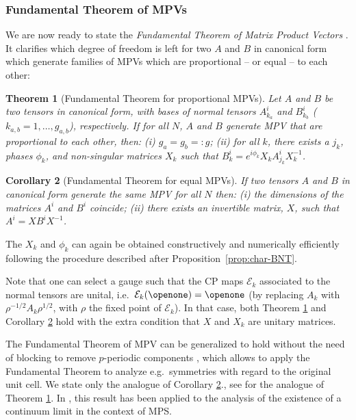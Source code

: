 \documentclass[rmp,aps,reprint,superscriptaddress,nobalancelastpage]{revtex4-1}
\newtheorem{thm}{Theorem}[section]
\newtheorem{cor}[thm]{Corollary}
\begin{document}
\subsubsection{Fundamental Theorem of MPVs}


We are now ready to state the \emph{Fundamental Theorem of Matrix Product Vectors} \cite{cirac:mpdo-rgfp}. It clarifies which degree of freedom is left for two $A$ and $B$ in canonical form which generate families of MPVs which are proportional -- or equal -- to each other:
\begin{thm}[Fundamental Theorem for proportional MPVs]
    \label{thm1}
    Let $A$ and $B$ be two tensors in canonical form, with bases of normal tensors $A^i_{k_a}$ and $B^i_{k_b}$ ($k_{a,b}=1,\dots,g_{a,b}$), respectively. If for all $N$, $A$ and $B$ generate MPV that are proportional to each other, then: (i) $g_a=g_b=:g$; (ii) for all $k$, there exists a $j_k$, phases $\phi_{k}$, and non-singular matrices $X_{k}$ such that $B^i_{k}=e^{i\phi_{k}}X_{k}A^i_{j_k}X_{k}^{-1}$.
\end{thm}

\begin{cor}[Fundamental Theorem for equal MPVs]
    \label{II_cor2}
    If two tensors $A$ and $B$ in canonical form generate the same MPV for all $N$ then: (i) the dimensions of the matrices $A^i$ and $B^i$ coincide; (ii) there exists an invertible matrix, $X$, such that
    $A^i = X B^i X^{-1}$.
\end{cor}
The $X_k$ and $\phi_k$ can again be obtained constructively and numerically efficiently following the procedure described after
Proposition~\ref{prop:char-BNT}.


Note that one can select a gauge such that
the CP maps $\mathcal{E}_k$ associated to the normal tensors are unital, i.e.\ $\mathcal E_k(\openone)=\openone$ (by replacing $A_k$ with $\rho^{-1/2}A_k \rho^{1/2}$, with $\rho$ the fixed point of $\mathcal E_k$). In that case, both Theorem \ref{thm1} and Corollary \ref{II_cor2} hold with the extra condition that $X$ and $X_k$ are unitary matrices.

The Fundamental Theorem of MPV can be generalized to hold without the need of blocking to remove $p$-periodic components \cite{delascuevas:fund-thm-periodic}, which allows to apply the Fundamental Theorem to analyze e.g.\ symmetries with regard to the original unit cell.
We state only the analogue of Corollary \ref{II_cor2}., see \textcite{delascuevas:fund-thm-periodic} for the analogue of Theorem \ref{thm1}. In \textcite{delascuevas:mps-cont-limit}, this result has been applied to the analysis of the existence of a continuum limit in the context of MPS.
\end{document}
